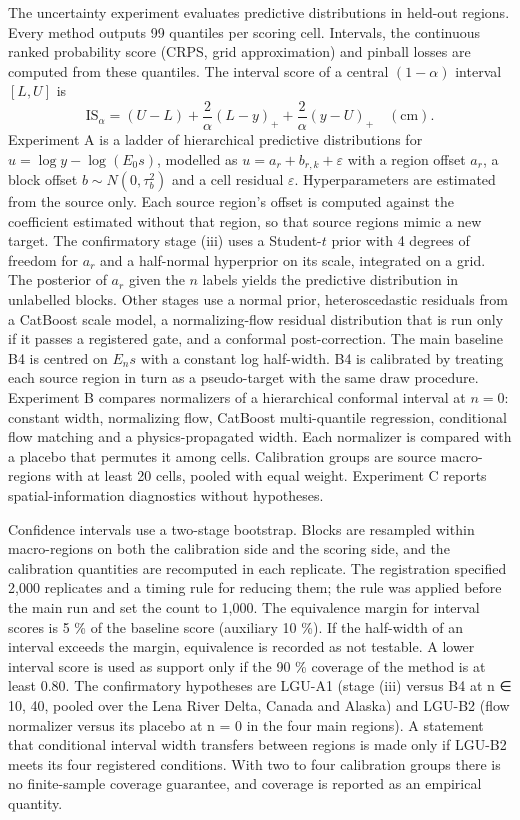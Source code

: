 The uncertainty experiment evaluates predictive distributions in held-out regions. Every method outputs 99 quantiles per scoring cell. Intervals, the continuous ranked probability score (CRPS, grid approximation) and pinball losses are computed from these quantiles\cite{GneitingRaftery2007}. The interval score of a central $(1-\alpha)$ interval $[L, U]$ is
\begin{equation}
\mathrm{IS}_{\alpha} = (U - L) + \frac{2}{\alpha}(L - y)_{+} + \frac{2}{\alpha}(y - U)_{+} \quad (\mathrm{cm}).
\end{equation}
Experiment A is a ladder of hierarchical predictive distributions for $u = \log y - \log(E_0 s)$, modelled as $u = a_r + b_{r,k} + \varepsilon$ with a region offset $a_r$, a block offset $b \sim N(0, \tau_b^2)$ and a cell residual $\varepsilon$. Hyperparameters are estimated from the source only. Each source region's offset is computed against the coefficient estimated without that region, so that source regions mimic a new target. The confirmatory stage (iii) uses a Student-$t$ prior with 4 degrees of freedom for $a_r$ and a half-normal hyperprior on its scale, integrated on a grid. The posterior of $a_r$ given the $n$ labels yields the predictive distribution in unlabelled blocks. Other stages use a normal prior, heteroscedastic residuals from a CatBoost scale model, a normalizing-flow residual distribution that is run only if it passes a registered gate, and a conformal post-correction. The main baseline B4 is centred on $E_n s$ with a constant log half-width. B4 is calibrated by treating each source region in turn as a pseudo-target with the same draw procedure. Experiment B compares normalizers of a hierarchical conformal interval at $n = 0$: constant width, normalizing flow, CatBoost multi-quantile regression, conditional flow matching and a physics-propagated width. Each normalizer is compared with a placebo that permutes it among cells. Calibration groups are source macro-regions with at least 20 cells, pooled with equal weight\cite{Dunn2023}. Experiment C reports spatial-information diagnostics without hypotheses.

Confidence intervals use a two-stage bootstrap. Blocks are resampled within macro-regions on both the calibration side and the scoring side, and the calibration quantities are recomputed in each replicate. The registration specified 2,000 replicates and a timing rule for reducing them; the rule was applied before the main run and set the count to 1,000. The equivalence margin for interval scores is 5 \% of the baseline score (auxiliary 10 \%). If the half-width of an interval exceeds the margin, equivalence is recorded as not testable. A lower interval score is used as support only if the 90 \% coverage of the method is at least 0.80. The confirmatory hypotheses are LGU-A1 (stage (iii) versus B4 at n ∈ {10, 40}, pooled over the Lena River Delta, Canada and Alaska) and LGU-B2 (flow normalizer versus its placebo at n = 0 in the four main regions). A statement that conditional interval width transfers between regions is made only if LGU-B2 meets its four registered conditions. With two to four calibration groups there is no finite-sample coverage guarantee, and coverage is reported as an empirical quantity.

